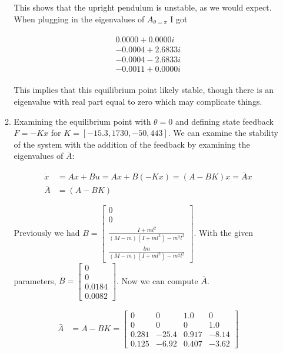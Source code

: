 \documentclass[11pt]{article}
\theoremstyle{definition}
\begin{document}
\begin{enumerate}
\begin{enumerate}
        This shows that the upright pendulum is unstable, as we would expect.  When plugging in the eigenvalues of $A_{\theta = \pi}$ I got

        \begin{align*}
            \begin{matrix}
               0.0000 + 0.0000i \\
              -0.0004 + 2.6833i \\
              -0.0004 - 2.6833i \\
              -0.0011 + 0.0000i
            \end{matrix}
        \end{align*}

        This implies that this equilibrium point likely stable, though there is an eigenvalue with real part equal to zero which may complicate things.

        \item %
        Examining the equilibrium point with $\theta = 0$ and defining state feedback $F = -Kx$ for $K = [ -15.3, 1730, -50, 443]$.  We can examine the stability of the system with the addition of the feedback by examining the eigenvalues of $\bar{A}$:

        \begin{align}
            \dot{x} &= Ax + Bu = Ax + B(-Kx) = (A - BK)x = \bar{A}x\\
            \bar{A} &= (A - BK)
        \end{align}

        Previously we had $B = \begin{bmatrix} 0 \\ 0 \\ \frac{I + ml^2}{(M - m)(I + ml^2) - m^2 l^2} \\ \frac{lm}{(M - m)(I + ml^2) - m^2 l^2} \end{bmatrix}$.  With the given parameters, $B = \begin{bmatrix} 0 \\ 0 \\ 0.0184 \\ 0.0082 \end{bmatrix}$.  Now we can compute $\bar{A}$.

        \begin{align}
            \bar{A} &= A - BK = \begin{bmatrix} 0 & 0 & 1.0 & 0\\
                                                0 & 0 & 0 & 1.0\\ 
                                                0.281 & -25.4 & 0.917 & -8.14\\ 
                                                0.125 & -6.92 & 0.407 & -3.62  \end{bmatrix}
        \end{align}


\end{enumerate}
\end{enumerate}
\end{document}
